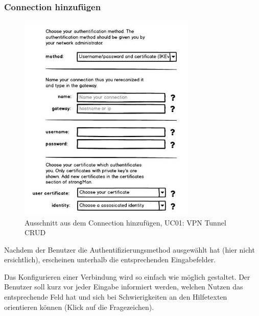 \subsubsection{Connection hinzufügen}
\noindent\begin{minipage}[t]{0.55\textwidth}
\vspace{0pt}
    \begin{figure}[H]
    	\centering
    	\includegraphics[width=240pt]{images/mockups/short_con_config.jpg}
    	\caption{Ausschnitt aus dem Connection hinzufügen,  UC01: VPN Tunnel CRUD}
    \end{figure}
\end{minipage}
\hfill
\begin{minipage}[t]{0.45\textwidth}
\vspace{0pt}
Nachdem der Benutzer die Authentifizierungsmethod ausgewählt hat (hier nicht ersichtlich), erscheinen unterhalb die entsprechenden Eingabefelder.

Das Konfigurieren einer Verbindung wird so einfach wie möglich gestaltet. Der Benutzer soll kurz vor jeder Eingabe informiert werden, welchen Nutzen das entsprechende Feld hat und sich bei Schwierigkeiten an den Hilfetexten orientieren können (Klick auf die Fragezeichen).
\end{minipage}